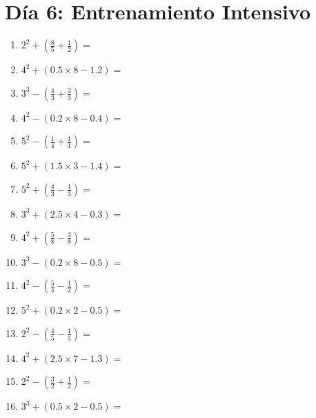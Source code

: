 \documentclass[12pt]{article}
\begin{document}
\section*{Día 6: Entrenamiento Intensivo}
\begin{enumerate}
\item \large $ 2^{2} + (\frac{8}{5} + \frac{1}{2}) = $ \vspace{1.6cm}
\item \large $ 4^{2} + (0.5 \times 8 - 1.2) = $ \vspace{1.6cm}
\item \large $ 3^{3} - (\frac{4}{3} + \frac{2}{3}) = $ \vspace{1.6cm}
\item \large $ 4^{2} - (0.2 \times 8 - 0.4) = $ \vspace{1.6cm}
\item \large $ 5^{2} - (\frac{1}{4} + \frac{1}{1}) = $ \vspace{1.6cm}
\item \large $ 5^{2} + (1.5 \times 3 - 1.4) = $ \vspace{1.6cm}
\item \large $ 5^{2} + (\frac{4}{3} - \frac{1}{3}) = $ \vspace{1.6cm}
\item \large $ 3^{3} + (2.5 \times 4 - 0.3) = $ \vspace{1.6cm}
\item \large $ 4^{2} + (\frac{5}{8} - \frac{3}{8}) = $ \vspace{1.6cm}
\item \large $ 3^{3} - (0.2 \times 8 - 0.5) = $ \vspace{1.6cm}
\newpage
\item \large $ 4^{2} - (\frac{5}{4} - \frac{1}{2}) = $ \vspace{1.6cm}
\item \large $ 5^{2} + (0.2 \times 2 - 0.5) = $ \vspace{1.6cm}
\item \large $ 2^{2} - (\frac{4}{5} - \frac{1}{5}) = $ \vspace{1.6cm}
\item \large $ 4^{2} + (2.5 \times 7 - 1.3) = $ \vspace{1.6cm}
\item \large $ 2^{2} - (\frac{3}{2} + \frac{1}{2}) = $ \vspace{1.6cm}
\item \large $ 3^{3} + (0.5 \times 2 - 0.5) = $ \vspace{1.6cm}

\end{enumerate}
\end{document}
